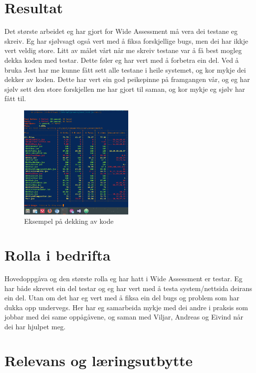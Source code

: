 \documentclass[12pt]{article}
\begin{document}
\section{Resultat}

Det største arbeidet eg har gjort for Wide Assessment må vera dei testane eg skreiv.
Eg har sjølvsagt også vert med å fiksa forskjellige bugs, men dei har ikkje vert
veldig store. Litt av målet vårt når me skreiv testane var å få best mogleg dekka
koden med testar. Dette føler eg har vert med å forbetra ein del. Ved å bruka
Jest har me kunne fått sett alle testane i heile systemet, og kor mykje dei dekker
av koden. Dette har vert ein god peikepinne på framgangen vår, og eg har sjølv sett
den store forskjellen me har gjort til saman, og kor mykje eg sjølv har fått til.

\begin{figure}[!h]
  \includegraphics[width=0.5\textwidth]{coverage}
  \centering
  \caption{Eksempel på dekking av kode}
  \label{fig:coverage1}
\end{figure}

\section{Rolla i bedrifta}

Hovedoppgåva og den største rolla eg har hatt i Wide Assessment er testar. Eg har
både skrevet ein del testar og eg har vert med å testa system/nettsida deirans ein
del. Utan om det har eg vert med å fiksa ein del bugs og problem som har dukka
opp undervegs. Her har eg samarbeida mykje med dei andre i praksis som jobbar med
dei same oppågåvene, og saman med Viljar, Andreas og Eivind når dei har hjulpet meg.


\section{Relevans og læringsutbytte}
\end{document}
